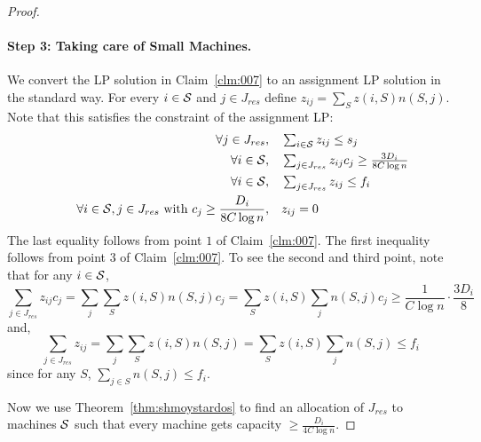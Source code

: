 \begin{proof}
\begin{claim}
\begin{enumerate} [noitemsep]
\end{enumerate}
\end{claim}
\paragraph{Step 3: Taking care of Small Machines.} We convert the LP solution in Claim~\ref{clm:007} to an assignment LP solution in the standard way.
For every $i\in {\cal S}$ and $j\in J_{res}$ define $z_{ij} = \sum_{S} z(i,S)n(S,j)$. Note that this satisfies the constraint of the assignment LP:
	\begin{alignat}{4}
		&& \quad \forall j \in J_{res},   &\quad  \textstyle \sum_{i\in {\cal S}} z_{ij}  \leq  s_j \notag  \\
		&& \quad \forall i\in {\cal S} ,      &\quad  \textstyle \sum_{j\in J_{res}}  z_{ij}c_j \geq \frac{3D_i}{8C\log n} \notag\\
	&& \quad \forall i\in {\cal S} ,      &\quad  \textstyle \sum_{j\in J_{res}}  z_{ij} \leq f_i \notag\\ 
		&& \quad \forall i\in {\cal S}, j\in J_{res} ~\textrm{with}~ c_j \geq \frac{D_i}{8C\log n}, & \quad z_{ij}   =  0   \notag
	\end{alignat}
	The last equality follows from point $1$ of Claim~\ref{clm:007}.
The first inequality follows from point 3 of Claim~\ref{clm:007}. To see the second and third point, note 
that for any $i\in {\cal S}$,
\[
\sum_{j\in J_{res}} z_{ij}c_j = \sum_j \sum_S z(i,S)n(S,j)c_j = \sum_S z(i,S) \sum_j n(S,j)c_j \geq \frac{1}{C\log n}\cdot \frac{3D_i}{8}
\]
	and,
\[
\sum_{j\in J_{res}} z_{ij} = \sum_j \sum_S z(i,S)n(S,j) = \sum_S z(i,S) \sum_j n(S,j) \leq f_i
\]
since for any $S$, $\sum_{j\in S} n(S,j) \leq f_i$. \smallskip

Now we use Theorem~\ref{thm:shmoystardos} to find an allocation of $J_{res}$ to machines ${\cal S}$ such that every machine gets capacity $\geq \frac{D_i}{4C\log n}$.

\end{proof}


